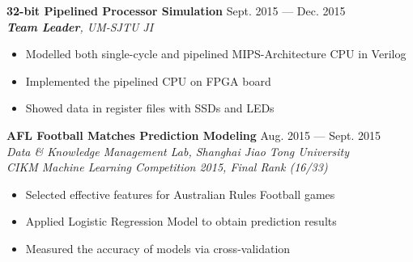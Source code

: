 \documentclass[margin,line,11pt]{res}
\begin{document}
\begin{resume}
{
\small
{\bf 32-bit Pipelined Processor Simulation} \hfill Sept. 2015 --- Dec. 2015\\
{\it \textbf{Team Leader}, UM-SJTU JI}
}
\begin{itemize}
\setlength{\itemsep}{0pt}
\setlength{\parskip}{0pt}
\setlength{\parsep}{0pt}
\item {\small Modelled both single-cycle and pipelined MIPS-Architecture CPU in Verilog}
\item {\small Implemented the pipelined CPU on FPGA board}
\item {\small Showed data in register files with SSDs and LEDs}
\end{itemize}
{
\small
{\bf AFL Football Matches Prediction Modeling} \hfill Aug. 2015 --- Sept. 2015\\
{\it Data \& Knowledge Management Lab, Shanghai Jiao Tong University \\ CIKM Machine Learning Competition 2015, Final Rank (16/33)}
}
\begin{itemize}
\setlength{\itemsep}{0pt}
\setlength{\parskip}{0pt}
\setlength{\parsep}{0pt}
\item {\small Selected effective features for Australian Rules Football games}
\item {\small Applied Logistic Regression Model to obtain prediction results}
\item {\small Measured the accuracy of models via cross-validation}\\
\end{itemize}




\end{resume}
\end{document}
